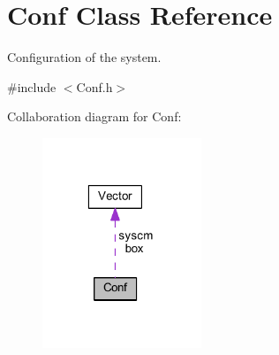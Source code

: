 \hypertarget{class_conf}{\section{Conf Class Reference}
\label{class_conf}
}


Configuration of the system.  




{\ttfamily \#include $<$Conf.\+h$>$}



Collaboration diagram for Conf\+:\nopagebreak
\begin{figure}[H]
\begin{center}
\leavevmode
\includegraphics[width=135pt]{class_conf__coll__graph}
\end{center}
\end{figure}
